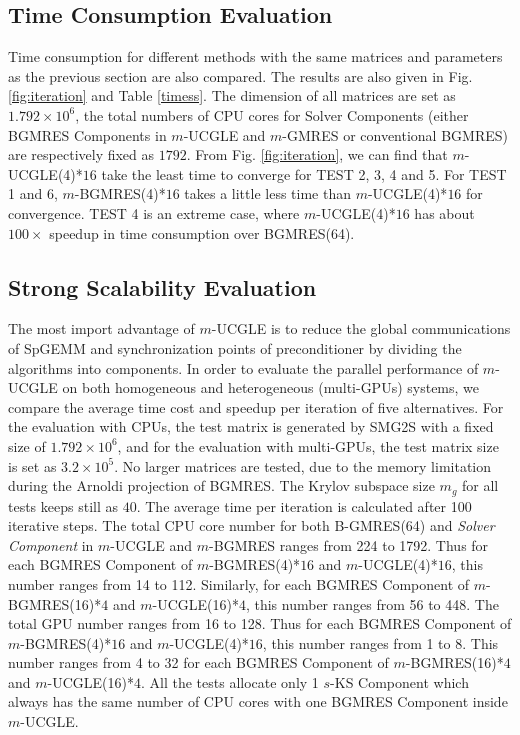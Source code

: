 \subsection{Time Consumption Evaluation}

Time consumption for different methods with the same matrices and parameters as the previous section are also compared. The results are also given in Fig. \ref{fig:iteration} and Table \ref{timess}. The dimension of all matrices are set as $1.792 \times 10^6$, the total numbers of CPU cores for Solver Components (either BGMRES Components in $m$-UCGLE and $m$-GMRES or conventional BGMRES) are respectively fixed as $1792$. From Fig. \ref{fig:iteration}, we can find that $m$-UCGLE(4)*$16$ take the least time to converge for TEST 2, 3, 4 and 5. For TEST 1 and 6, $m$-BGMRES(4)*$16$ takes a little less time than $m$-UCGLE(4)*$16$ for convergence. TEST 4 is an extreme case, where $m$-UCGLE(4)*$16$ has about $100\times$ speedup in time consumption over BGMRES(64).

\subsection{Strong Scalability Evaluation}

The most import advantage of $m$-UCGLE is to reduce the global communications of SpGEMM and synchronization points of preconditioner by dividing the algorithms into components. In order to evaluate the parallel performance of $m$-UCGLE on both homogeneous and heterogeneous (multi-GPUs) systems, we compare the average time cost and speedup per iteration of five alternatives. For the evaluation with CPUs, the test matrix is generated by SMG2S with a fixed size of $1.792 \times 10^6$, and for the evaluation with multi-GPUs, the test matrix size is set as $3.2 \times 10^5$. No larger matrices are tested, due to the memory limitation during the Arnoldi projection of BGMRES. The Krylov subspace size $m_g$ for all tests keeps still as $40$. The average time per iteration is calculated after 100 iterative steps. The total CPU core number for both B-GMRES(64) and \textit{Solver Component} in $m$-UCGLE and $m$-BGMRES ranges from 224 to 1792. Thus for each BGMRES Component of $m$-BGMRES(4)*$16$ and $m$-UCGLE(4)*$16$, this number ranges from 14 to 112. Similarly, for each BGMRES Component of $m$-BGMRES(16)*$4$ and $m$-UCGLE(16)*$4$, this number ranges from 56 to 448. The total GPU number ranges from 16 to 128. Thus for each BGMRES Component of $m$-BGMRES(4)*$16$ and $m$-UCGLE(4)*$16$, this number ranges from 1 to 8. This number ranges from 4 to 32 for each BGMRES Component of $m$-BGMRES(16)*$4$ and $m$-UCGLE(16)*$4$. All the tests allocate only 1 $s$-KS Component which always has the same number of CPU cores with one BGMRES Component inside $m$-UCGLE.

